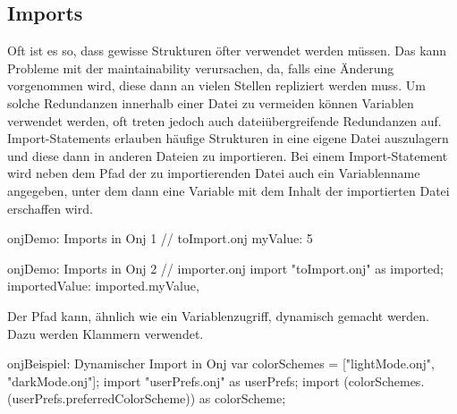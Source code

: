 
\subsection{Imports}\label{subsec:imports}

\renewcommand{\kapitelautor}{Autor: Marvin Kurka}

Oft ist es so, dass gewisse Strukturen öfter verwendet werden müssen.
Das kann Probleme mit der maintainability verursachen, da, falls eine Änderung vorgenommen wird, diese dann an vielen
Stellen repliziert werden muss.
Um solche Redundanzen innerhalb einer Datei zu vermeiden können Variablen verwendet werden, oft treten jedoch auch
dateiübergreifende Redundanzen auf.
Import-Statements erlauben häufige Strukturen in eine eigene Datei auszulagern und diese dann in anderen Dateien zu
importieren.
Bei einem Import-Statement wird neben dem Pfad der zu importierenden Datei auch ein Variablenname angegeben, unter dem
dann eine Variable mit dem Inhalt der importierten Datei erschaffen wird.

\begin{codeBlock}{onj}{Demo: Imports in Onj 1}
// toImport.onj
myValue: 5
\end{codeBlock}

\begin{codeBlock}{onj}{Demo: Imports in Onj 2}
// importer.onj
import "toImport.onj" as imported;
importedValue: imported.myValue,
\end{codeBlock}

Der Pfad kann, ähnlich wie ein Variablenzugriff, dynamisch gemacht werden.
Dazu werden Klammern verwendet.

\begin{codeBlock}{onj}{Beispiel: Dynamischer Import in Onj}
var colorSchemes = ["lightMode.onj", "darkMode.onj"];
import "userPrefs.onj" as userPrefs;
import (colorSchemes.(userPrefs.preferredColorScheme)) as colorScheme;
\end{codeBlock}

\renewcommand{\kapitelautor}{}
